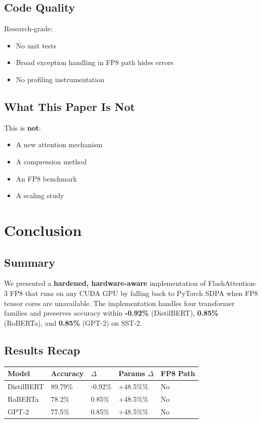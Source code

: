 \subsection{Code Quality}

Research-grade:

\begin{itemize}
\item No unit tests
\item Broad exception handling in FP8 path hides errors
\item No profiling instrumentation

\end{itemize}
\subsection{What This Paper Is Not}

This is \textbf{not}:

\begin{itemize}
\item A new attention mechanism
\item A compression method
\item An FP8 benchmark
\item A scaling study

\end{itemize}



\section{Conclusion}

\subsection{Summary}

We presented a \textbf{hardened, hardware-aware} implementation of FlashAttention-3 
FP8 that runs on any CUDA GPU by falling back to PyTorch SDPA when FP8 
tensor cores are unavailable. The implementation handles four transformer 
families and preserves accuracy within \textbf{-0.92\%} (DistilBERT), 
\textbf{0.85\%} (RoBERTa), and \textbf{0.85\%} (GPT-2) on SST-2.

\subsection{Results Recap}

\begin{table}[H]
\centering
\small
\begin{tabular}{lllll}
\toprule
\textbf{Model} & \textbf{Accuracy} & \textbf{$\Delta$} & \textbf{Params $\Delta$} & \textbf{FP8 Path} \\
\midrule
DistilBERT & 89.79\% & -0.92\% & +48.5\%\% & No \\
RoBERTa & 78.2\% & 0.85\% & +48.5\%\% & No \\
GPT-2 & 77.5\% & 0.85\% & +48.5\%\% & No \\
\bottomrule
\end{tabular}
\end{table}

